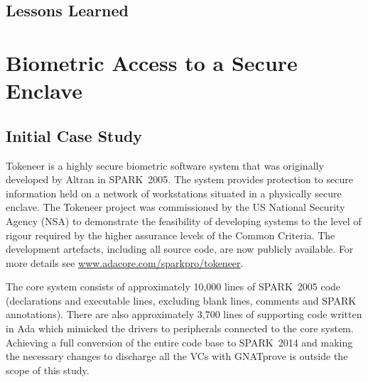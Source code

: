 \documentclass{article}
\newcommand{\oldspark}{SPARK~2005\xspace}
\newcommand{\newspark}{SPARK~2014\xspace}
\begin{document}
\subsection{Lessons Learned}

\section{Biometric Access to a Secure Enclave}


\subsection{Initial Case Study}

Tokeneer is a highly secure biometric software system that was originally
developed by Altran in \oldspark. The system provides protection to secure
information held on a network of workstations situated in a physically
secure enclave. The Tokeneer project was commissioned by the US National
Security Agency (NSA) to demonstrate the feasibility of developing systems
to the level of rigour required by the higher assurance levels of the
Common Criteria. The development artefacts, including all source code,
are now publicly available. For more details see
\url{www.adacore.com/sparkpro/tokeneer}.

The core system consists of approximately 10,000 lines of \oldspark code
(declarations and executable lines, excluding blank lines, comments and
SPARK annotations). There are also approximately 3,700 lines of supporting
code written in Ada which mimicked the drivers to peripherals connected
to the core system. Achieving a full conversion of the entire code base
to \newspark and making the necessary changes to discharge all the VCs
with GNATprove is outside the scope of this study.
\end{document}

